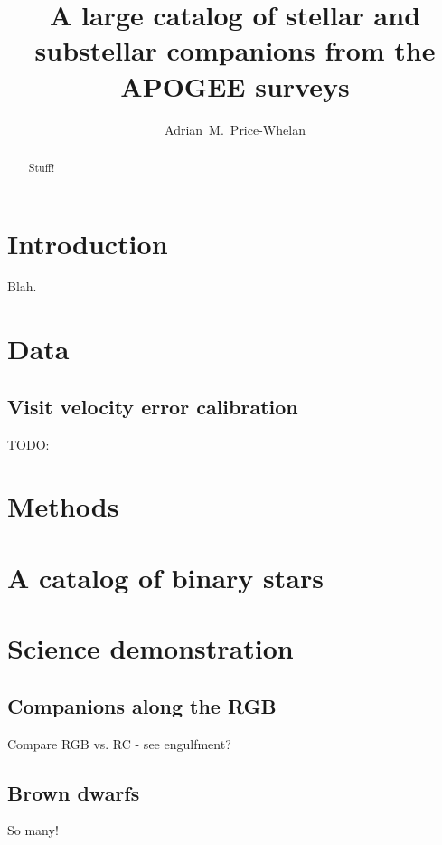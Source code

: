 \documentclass[modern]{aastex62}
\begin{document}
\title{A large catalog of stellar and substellar companions from the APOGEE surveys}

\author[0000-0003-0872-7098]{Adrian~M.~Price-Whelan}


\begin{abstract}
Stuff!
\end{abstract}

\keywords{}


\section{Introduction} \label{sec:intro}

Blah.


\section{Data} \label{sec:data}

\subsection{Visit velocity error calibration} \label{sec:visitcalib}
TODO:


\section{Methods} \label{sec:methods}


\section{A catalog of binary stars} \label{sec:catalog}


\section{Science demonstration} \label{sec:science}

\subsection{Companions along the RGB}
Compare RGB vs. RC - see engulfment?

\subsection{Brown dwarfs}
So many!
\end{document}

